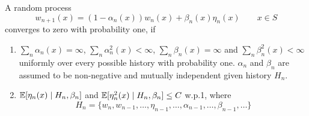 \begin{lemma}\label{lemma following dvoretzky}
    A random process
    \[
        w_{n+1}(x)=(1-\alpha_n(x))w_n(x) +\beta_n(x)\eta_n(x) \qquad x\in S
    \]
    converges to zero with probability one, if 
    \begin{enumerate}
        \item \(\sum_n \alpha_n(x)=\infty\), \(\sum_n \alpha_n^2(x) <\infty\), \(\sum_n\beta_n(x)=\infty\) and \(\sum_n \beta_n^2 (x)<\infty\) uniformly over every possible history with probability one. \(\alpha_n\) and \(\beta_n\) are assumed to be non-negative and mutually independent given history \(H_n\).
        \item \(\mathbb{E}[\eta_n(x)\mid H_n, \beta_n]  \) and \( \mathbb{E}[\eta_n^2(x)\mid H_n,\beta_n]\le C \) w.p.1, where 
        \[
            H_n=\{w_n, w_{n-1}, \dots, \eta_{n-1}, \dots, \alpha_{n-1},\dots, \beta_{n-1},\dots\}
        \]
    \end{enumerate}
\end{lemma}
